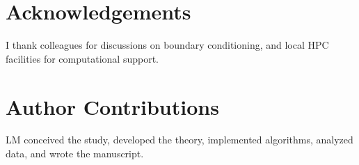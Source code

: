 \documentclass[9pt]{elife}
\begin{document}
\section*{Acknowledgements}
I thank colleagues for discussions on boundary conditioning, and local HPC facilities for computational support.

\section*{Author Contributions}
LM conceived the study, developed the theory, implemented algorithms, analyzed data, and wrote the manuscript.



\end{document}
